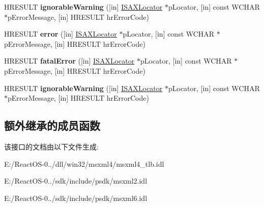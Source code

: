 \begin{DoxyCompactItemize}
\item 
\mbox{\label{interface_m_s_x_m_l2_1_1_i_s_a_x_error_handler_aae67c103a383521fbca128ce05def1a3}} 
H\+R\+E\+S\+U\+LT {\bfseries ignorable\+Warning} (\mbox{[}in\mbox{]} \hyperlink{interface_m_s_x_m_l2_1_1_i_s_a_x_locator}{I\+S\+A\+X\+Locator} $\ast$p\+Locator, \mbox{[}in\mbox{]} const W\+C\+H\+AR $\ast$p\+Error\+Message, \mbox{[}in\mbox{]} H\+R\+E\+S\+U\+LT hr\+Error\+Code)
\item 
\mbox{\label{interface_m_s_x_m_l2_1_1_i_s_a_x_error_handler_aed1d56c534fcf5c2f83de7340b964334}} 
H\+R\+E\+S\+U\+LT {\bfseries error} (\mbox{[}in\mbox{]} \hyperlink{interface_m_s_x_m_l2_1_1_i_s_a_x_locator}{I\+S\+A\+X\+Locator} $\ast$p\+Locator, \mbox{[}in\mbox{]} const W\+C\+H\+AR $\ast$p\+Error\+Message, \mbox{[}in\mbox{]} H\+R\+E\+S\+U\+LT hr\+Error\+Code)
\item 
\mbox{\label{interface_m_s_x_m_l2_1_1_i_s_a_x_error_handler_a92b3882a755ad3f0204edccb1d5bcb10}} 
H\+R\+E\+S\+U\+LT {\bfseries fatal\+Error} (\mbox{[}in\mbox{]} \hyperlink{interface_m_s_x_m_l2_1_1_i_s_a_x_locator}{I\+S\+A\+X\+Locator} $\ast$p\+Locator, \mbox{[}in\mbox{]} const W\+C\+H\+AR $\ast$p\+Error\+Message, \mbox{[}in\mbox{]} H\+R\+E\+S\+U\+LT hr\+Error\+Code)
\item 
\mbox{\label{interface_m_s_x_m_l2_1_1_i_s_a_x_error_handler_aae67c103a383521fbca128ce05def1a3}} 
H\+R\+E\+S\+U\+LT {\bfseries ignorable\+Warning} (\mbox{[}in\mbox{]} \hyperlink{interface_m_s_x_m_l2_1_1_i_s_a_x_locator}{I\+S\+A\+X\+Locator} $\ast$p\+Locator, \mbox{[}in\mbox{]} const W\+C\+H\+AR $\ast$p\+Error\+Message, \mbox{[}in\mbox{]} H\+R\+E\+S\+U\+LT hr\+Error\+Code)
\end{DoxyCompactItemize}
\subsection*{额外继承的成员函数}


该接口的文档由以下文件生成\+:\begin{DoxyCompactItemize}
\item 
E\+:/\+React\+O\+S-\/0../dll/win32/msxml4/msxml4\+\_\+tlb.\+idl\item 
E\+:/\+React\+O\+S-\/0../sdk/include/psdk/msxml2.\+idl\item 
E\+:/\+React\+O\+S-\/0../sdk/include/psdk/msxml6.\+idl\end{DoxyCompactItemize}
